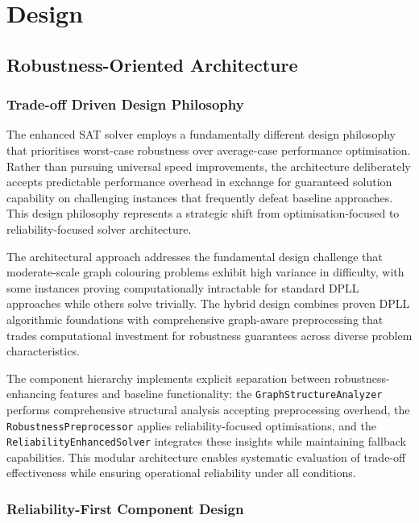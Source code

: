 \section{Design}

\subsection{Robustness-Oriented Architecture}

\subsubsection{Trade-off Driven Design Philosophy}

The enhanced SAT solver employs a fundamentally different design philosophy that prioritises worst-case robustness over average-case performance optimisation. Rather than pursuing universal speed improvements, the architecture deliberately accepts predictable performance overhead in exchange for guaranteed solution capability on challenging instances that frequently defeat baseline approaches. This design philosophy represents a strategic shift from optimisation-focused to reliability-focused solver architecture.

The architectural approach addresses the fundamental design challenge that moderate-scale graph colouring problems exhibit high variance in difficulty, with some instances proving computationally intractable for standard DPLL approaches while others solve trivially. The hybrid design combines proven DPLL algorithmic foundations with comprehensive graph-aware preprocessing that trades computational investment for robustness guarantees across diverse problem characteristics.

The component hierarchy implements explicit separation between robustness-enhan\-cing features and baseline functionality: the \texttt{GraphStructureAnalyzer} performs comprehensive structural analysis accepting preprocessing overhead, the \texttt{Robustness\-Pre\-processor} applies reliability-focused optimisations, and the \texttt{Reliability\-Enhanced\-Solver} integrates these insights while maintaining fallback capabilities. This modular architecture enables systematic evaluation of trade-off effectiveness while ensuring operational reliability under all conditions.

\subsubsection{Reliability-First Component Design}

